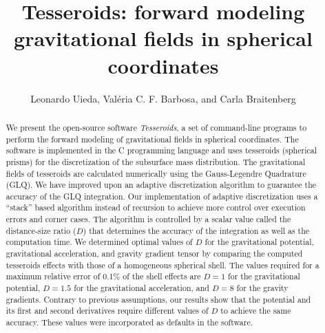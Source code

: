 \documentclass[manuscript,endfloat]{geophysics}
\title{
    Tesseroids: forward modeling gravitational fields in spherical coordinates
}
\author{
    Leonardo Uieda\footnotemark[1]\footnotemark[2],
    Val\'eria C. F. Barbosa\footnotemark[2],
    and
    Carla Braitenberg\footnotemark[3]
}
\begin{document}
\maketitle



\address{Peer-reviewed code related to this article can be found at
http://software.seg.org/2016/000X.
\\
\footnotemark[1]Universidade do Estado do Rio de Janeiro,
Rio de Janeiro, Brazil.
email: leouieda@gmail.com
\\
\footnotemark[2]Observat\'orio Nacional,
Rio de Janeiro, Brazil.
email: valcris@on.br
\\
\footnotemark[3]Department of Mathematics and Geosciences,
University of Trieste, Trieste, Italy
}

\begin{abstract}
We present the open-source software \emph{Tesseroids},
a set of command-line programs to perform the forward modeling
of gravitational fields in spherical coordinates.
The software is implemented in the C programming language and uses tesseroids
(spherical prisms) for the discretization of the subsurface mass distribution.
The gravitational fields of tesseroids are calculated numerically using
the Gauss-Legendre Quadrature (GLQ).
We have improved upon an adaptive discretization algorithm
to guarantee the accuracy of the GLQ integration.
Our implementation of adaptive discretization
uses a ``stack'' based algorithm
instead of recursion to achieve
more control over execution errors and corner cases.
The algorithm is controlled by
a scalar value called the distance-size ratio ($D$)
that determines the accuracy of the integration as well as
the computation time.
We determined optimal values of $D$
for the gravitational potential, gravitational acceleration,
and gravity gradient tensor
by comparing the computed tesseroids effects
with those of a homogeneous spherical shell.
The values required for a maximum relative error of 0.1\% of the shell effects
are $D = 1$ for the gravitational potential, $D = 1.5$ for the gravitational
acceleration, and $D = 8$ for the gravity gradients.
Contrary to previous assumptions,
our results show that the potential and its first and second derivatives
require different values of $D$ to achieve the same accuracy.
These values were incorporated as defaults in the software.
\end{abstract}
\end{document}
